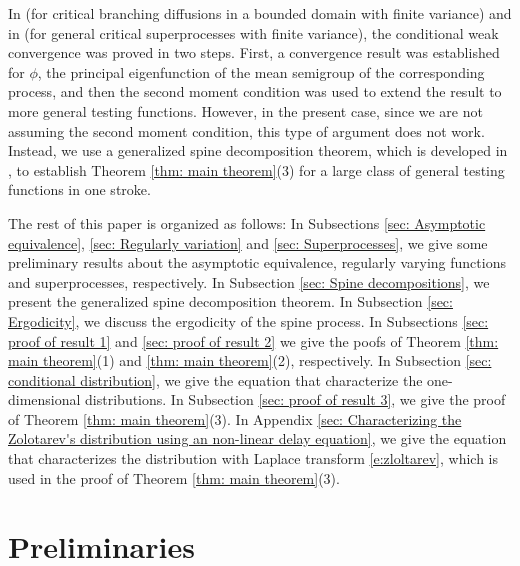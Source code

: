\documentclass[12pt,a4paper]{amsart}
\theoremstyle{definition}
\numberwithin{equation}{section}
\begin{document}
In \cite{Powell2015An-invariance} (for critical branching diffusions in a bounded domain with finite variance) and in \cite{RenSongSun2017Spine, RenSongZhang2015Limit} (for general critical superprocesses with finite variance), the conditional weak convergence was proved in two steps.
First, a convergence result was established for $\phi$, the principal eigenfunction of the mean semigroup of the corresponding process, and then the second moment condition was used to extend the result to more general testing functions.
However, in the present case, since we are not assuming the second moment condition, this type of argument does not work.
Instead, we use a generalized spine decomposition theorem, which is developed in \cite{RenSongSun2017Spine}, to establish Theorem \ref{thm: main theorem}(3) for a large class of general testing functions in one stroke.

The rest of this paper is organized as follows:
In Subsections \ref{sec: Asymptotic equivalence}, \ref{sec: Regularly variation} and \ref{sec: Superprocesses}, we give some preliminary results about the asymptotic equivalence, regularly varying functions and superprocesses, respectively.
In Subsection \ref{sec: Spine decompositions}, we present the generalized spine decomposition theorem.
In Subsection \ref{sec: Ergodicity}, we discuss the ergodicity of the spine process.
In Subsections \ref{sec: proof of result 1} and \ref{sec: proof of result 2} we give the poofs of Theorem \ref{thm: main theorem}(1) and \ref{thm: main theorem}(2), respectively.
In Subsection \ref{sec: conditional distribution}, we give the equation that characterize the one-dimensional distributions.
In Subsection \ref{sec: proof of result 3}, we give the proof of Theorem \ref{thm: main theorem}(3).
In Appendix \ref{sec: Characterizing the Zolotarev's distribution using an non-linear delay equation}, we give the equation that characterizes the distribution with Laplace transform \eqref{e:zloltarev}, which is used in the proof of Theorem \ref{thm: main theorem}(3).

\section{Preliminaries} 
\label{sec: Preliminaries}
\end{document}

